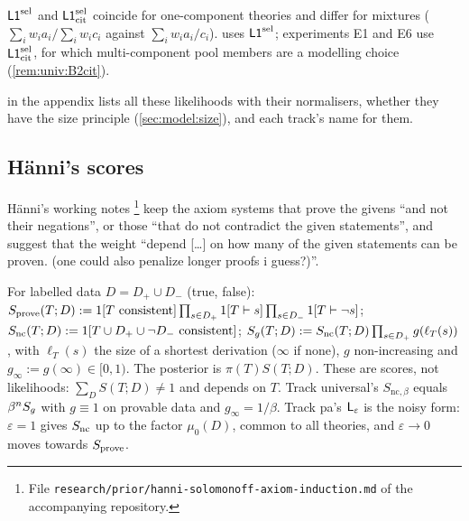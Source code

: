 \begin{remark}\label{rem:model:sel}
$\mathord{\mathsf{L1}}^{\mathrm{sel}}$ and $\mathord{\mathsf{L1}}^{\mathrm{sel}}_{\mathrm{cit}}$ coincide for one-component theories and differ for mixtures ($\sum_iw_ia_i/\sum_iw_ic_i$ against $\sum_iw_ia_i/c_i$).  uses $\mathord{\mathsf{L1}}^{\mathrm{sel}}$; experiments E1 and E6 use $\mathord{\mathsf{L1}}^{\mathrm{sel}}_{\mathrm{cit}}$, for which multi-component pool members are a modelling choice (\cref{rem:univ:B2cit}).
\end{remark}

 in the appendix lists all these likelihoods with their normalisers, whether they have the size principle (\cref{sec:model:size}), and each track's name for them.


\subsection{H\"anni's scores}\label{sec:model:scores}

H\"anni's working notes \citep{hanni2026notes}\footnote{File \texttt{research/prior/hanni-solomonoff-axiom-induction.md} of the accompanying repository.} keep the axiom systems that prove the givens ``and not their negations'', or those ``that do not contradict the given statements'', and suggest that the weight ``depend [\dots] on how many of the given statements can be proven. (one could also penalize longer proofs i guess?)''.

\begin{definition}\label{def:model:scores}
For labelled data $D=D_+\cup D_-$ (true, false):
$S_{\mathrm{prove}}(T;D):=1[T\text{ consistent}]\prod_{s\in D_+}1[T\vdash s]\prod_{s\in D_-}1[T\vdash\neg s]$;
$S_{\mathrm{nc}}(T;D):=1[T\cup D_+\cup\neg D_-\text{ consistent}]$;
$S_{g}(T;D):=S_{\mathrm{nc}}(T;D)\prod_{s\in D_+}g(\ell_T(s))$, with $\ell_T(s)$ the size of a shortest derivation ($\infty$ if none), $g$ non-increasing and $g_\infty:=g(\infty)\in[0,1)$. The posterior is $\pi(T)S(T;D)$. These are scores, not likelihoods: $\sum_DS(T;D)\ne1$ and depends on $T$. Track universal's $S_{\mathrm{nc},\beta}$ equals $\beta^nS_{g}$ with $g\equiv1$ on provable data and $g_\infty=1/\beta$. Track pa's $\mathsf{L}_{\varepsilon}$ is the noisy form: $\varepsilon=1$ gives $S_{\mathrm{nc}}$ up to the factor $\mu_0(D)$, common to all theories, and $\varepsilon\to0$ moves towards $S_{\mathrm{prove}}$.
\end{definition}

